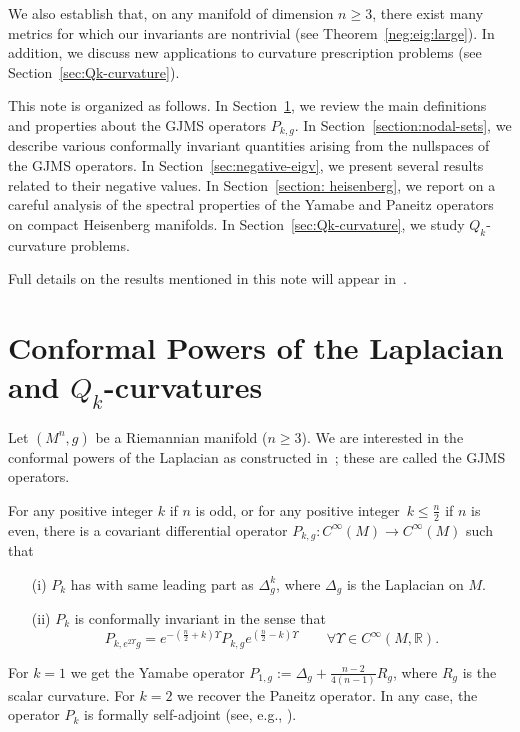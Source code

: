 \documentclass{amsart}
\theoremstyle{definition}
\theoremstyle{remark}
\begin{document}
We also establish 
that, on any manifold of dimension $n\geq 3$, there exist many metrics 
for which our invariants are nontrivial (see Theorem~\ref{neg:eig:large}). 
In addition, we discuss new applications 
to curvature prescription problems (see Section~\ref{sec:Qk-curvature}). 

This note is organized as follows. In Section~\ref{sec:GJMS}, we
review the main definitions and properties about the GJMS operators
$P_{k,g}$. In Section~\ref{section:nodal-sets}, we describe various
conformally invariant quantities arising from the nullspaces of the GJMS
operators. In Section~\ref{sec:negative-eigv}, we present several
results related to their negative values. In Section~\ref{section:
  heisenberg}, we report on a careful analysis of the spectral properties
of the Yamabe and Paneitz operators on compact Heisenberg
manifolds. In Section~\ref{sec:Qk-curvature}, we study
$Q_{k}$-curvature problems.

Full details on the results mentioned in this note will appear
in~\cite{CGJP1,CGJP2}.

\section{Conformal Powers of the Laplacian and $Q_{k}$-curvatures}\label{sec:GJMS}
Let $(M^{n},g)$ be a Riemannian manifold ($n\geq 3$). We are
interested in the conformal powers of the Laplacian as constructed
in~\cite{GJMS}; these are called the GJMS operators.  

For any positive integer $k$ if $n$ is odd, or for any positive integer~$k\leq
\frac{n}{2}$ if $n$ is even, there is a covariant differential
operator $P_{k,g}:C^{\infty}(M)\rightarrow C^{\infty}(M)$ such that
\begin{enumerate}
    \item[(i)]  $P_{k}$ has with same leading part as $\Delta_{g}^{k}$, where $\Delta_{g}$ 
is the Laplacian on $M$. 

    \item[(ii)] $P_{k}$ is conformally invariant in the sense that
    \begin{equation}
P_{k,e^{2\Upsilon} g}=e^{-(\frac{n}{2}+k)  \Upsilon}P_{k,g}
e^{ (\frac{n}{2}-k) \Upsilon} \qquad \forall \Upsilon\in C^{\infty}(M,{{\mathbb{R}}}).
\label{eq:conf-inv-Pk}
\end{equation}
\end{enumerate}

For $k=1$ we get the Yamabe operator $P_{1,g}:=\Delta_{g}+\frac{n-2}{4(n-1)}R_{g}$, where $R_{g}$ is the scalar 
curvature. For $k=2$ we recover the Paneitz operator. In any case, the operator $P_{k}$ is formally self-adjoint (see, 
e.g., \cite{FG02}).
\end{document}

